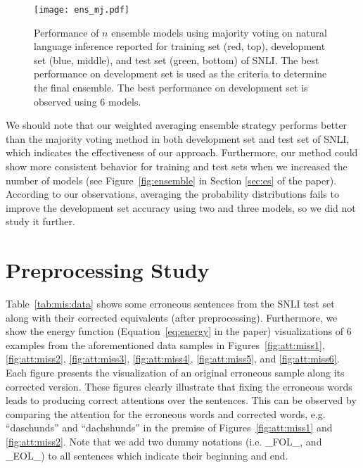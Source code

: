 \documentclass[11pt,a4paper]{article}
\begin{document}
	\begin{figure}[t]
		\centering
		\texttt{[image: ens\_mj.pdf]}
		\caption{Performance of $n$ ensemble models using majority voting on natural language inference reported for training set (red, top), development set (blue, middle), and test set (green, bottom) of SNLI. The best performance on development set is used as the criteria to determine the final ensemble. The best performance on development set is observed using 6 models. \label{fig:mj:ensemble}}
	\end{figure}
	
	We should note that our weighted averaging ensemble strategy performs better than the majority voting method in both development set and test set of SNLI, which indicates the effectiveness of our approach. Furthermore, our method could show more consistent behavior for training and test sets when we increased the number of models (see Figure~\ref{fig:ensemble} in Section \ref{sec:es} of the paper). According to our observations, averaging the probability distributions fails to improve the development set accuracy using two and three models, so we did not study it further.
	
	\section{Preprocessing Study}
	\label{app:preproc:sec}
	
	\noindent Table~\ref{tab:mis:data} shows some erroneous sentences from the SNLI test set along with their corrected equivalents (after preprocessing). Furthermore, we show the energy function (Equation~\ref{eq:energy} in the paper) visualizations of 6 examples from the aforementioned data samples in Figures~\ref{fig:att:miss1}, \ref{fig:att:miss2}, \ref{fig:att:miss3}, \ref{fig:att:miss4}, \ref{fig:att:miss5}, and \ref{fig:att:miss6}. Each figure presents the visualization of an original erroneous sample along its corrected version. These figures clearly illustrate that fixing the erroneous words leads to producing correct attentions over the sentences. This can be observed by comparing the attention for the erroneous words and corrected words, e.g. ``daschunds'' and ``dachshunds'' in the premise of Figures~\ref{fig:att:miss1} and \ref{fig:att:miss2}. Note that we add two dummy notations (i.e. \_FOL\_, and \_EOL\_) to all sentences which indicate their beginning and end. 
	

	
	\begin{figure*}[ht]
		\begin{center}
\end{center}
		\caption{
			Visualization of the energy function for one erroneous sample (a) and the fixed sample (b). The gold label is \emph{Entailment}. Our model returns \emph{Contradiction} for the erroneous sample, but correctly classifies the fixed sample.
		}
		\label{fig:att:miss1}
	\end{figure*}
	
\end{document}
